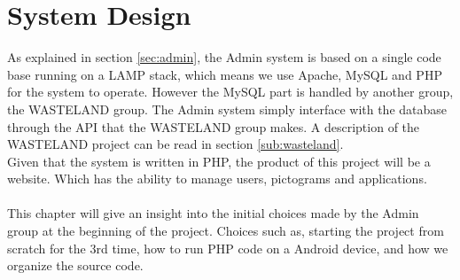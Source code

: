 \chapter{System Design}
\label{chap:systemDesign}
As explained in section \vref{sec:admin}, the Admin system is based on a single code base running on a LAMP stack, which means we use Apache, MySQL and PHP for the system to operate. However the MySQL part is handled by another group, the WASTELAND group. The Admin system simply interface with the database through the API that the WASTELAND group makes. A description of the WASTELAND project can be read in section \vref{sub:wasteland}.\\
Given that the system is written in PHP, the product of this project will be a website. Which has the ability to manage users, pictograms and applications.\\
\\
This chapter will give an insight into the initial choices made by the Admin group at the beginning of the project. Choices such as, starting the project from scratch for the 3rd time, how to run PHP code on a Android device, and how we organize the source code.



